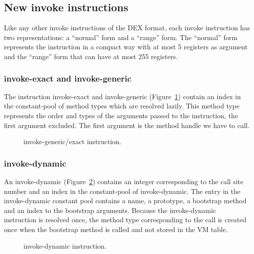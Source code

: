 \documentclass{sig-alternate}
\begin{document}
  \subsection{New invoke instructions}
    Like any other invoke instructions of the DEX format,
    each invoke instruction has two representations: a ``normal'' form and a ``range'' form.
    The ``normal'' form represents the instruction in a compact way with at most 5 registers as argument 
    and the ``range'' form that can have at most 255 registers.

    \subsubsection{invoke-exact and invoke-generic}

      The instruction invoke-exact and invoke-generic (Figure~\ref{INGEins}) contain an index
      in the constant-pool of method types which are resolved lazily.
      This method type represents the order and types of the arguments passed to the instruction, the first argument excluded.
      The first argument is the method handle we have to call.\\

      \begin{figure}[!ht]
        \centering \resizebox{1.\linewidth}{!}{}
        \caption{invoke-generic/exact instruction.}\vspace{-1em}
        \label{INGEins}
      \end{figure}

    \subsubsection{invoke-dynamic}

      An invoke-dynamic (Figure~\ref{INDYins}) contains an integer corresponding to the call site number
      and an index in the constant-pool of invoke-dynamic.
      The entry in the invoke-dynamic constant pool contains a name, a prototype, a bootstrap method and an index to
      the bootstrap arguments. 
      Because the invoke-dynamic instruction is resolved once, the method type corresponding to the call
      is created once when the bootstrap method is called and not stored in the VM table.

      \begin{figure}[!ht]
        \centering \resizebox{1.\linewidth}{!}{}
        \caption{invoke-dynamic instruction.}\vspace{-1em}
        \label{INDYins}
      \end{figure}
\end{document}

